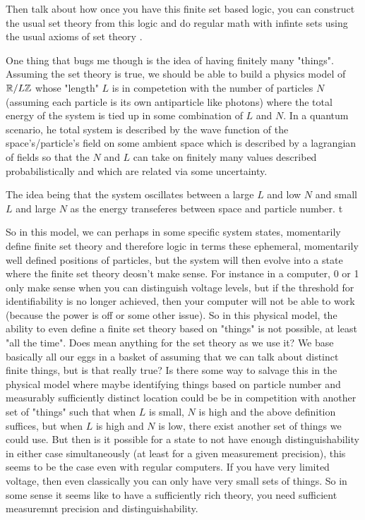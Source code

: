 \documentclass{book}
\begin{document}
	Then talk about how once you have this finite set based logic, you can construct the usual set theory from this logic and do regular math with infinte sets using the usual axioms of set theory \tcr{}. 
	
	One thing that bugs me though is the idea of having finitely many "things". Assuming the set theory is true, we should be able to build a physics model of $\mathbb{R}/L\mathbb{Z}$ whose "length" $L$ is in competetion with the number of particles $N$ (assuming each particle is its own antiparticle like photons) where the total energy of the system is tied up in some combination of $L$ and $N$. In a quantum scenario, he total system is described by the wave function of the space's/particle's field on some ambient space which is described by a lagrangian of fields so that the $N$ and $L$ can take on finitely many values described probabilistically and which are related via some uncertainty. 
	
	The idea being that the system oscillates between a large $L$ and low $N$ and small $L$ and large $N$ as the energy transeferes between space and particle number. t
	
	So in this model, we can perhaps in some specific system states, momentarily define finite set theory and therefore logic in terms these ephemeral, momentarily well defined positions of particles, but the system will then evolve into a state where the finite set theory deosn't make sense. For instance in a computer, 0 or 1 only make sense when you can distinguish voltage levels, but if the threshold for identifiability is no longer achieved, then your computer will not be able to work (because the power is off or some other issue). So in this physical model, the ability to even define a finite set theory based on "things" is not possible, at least "all the time". Does mean anything for the set theory as we use it? We base basically all our eggs in a basket of assuming that we can talk about distinct finite things, but is that really true? Is there some way to salvage this in the physical model where maybe identifying things based on particle number and measurably sufficiently distinct location could be be in competition with another set of "things" such that when $L$ is small, $N$ is high and the above definition suffices, but when $L$ is high and $N$ is low, there exist another set of things we could use. But then is it possible for a state to not have enough distinguishability in either case simultaneously (at least for a given measurement precision), this seems to be the case even with regular computers. If you have very limited voltage, then even classically you can only have very small sets of things. So in some sense it seems like to have a sufficiently rich theory, you need sufficient measuremnt precision and distinguishability.   
	
\end{document}
